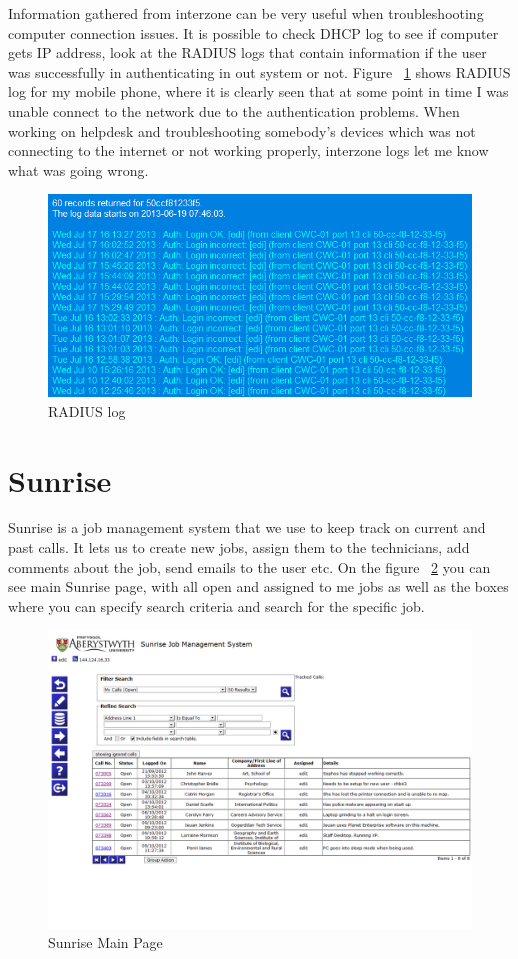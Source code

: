\documentclass[10pt,a4paper,headinclude=true]{report}
\begin{document}
Information gathered from interzone can be very useful when troubleshooting computer connection issues. It is possible to check DHCP log to see if computer gets IP address, look at the RADIUS logs that contain information if the user was successfully in authenticating in out system or not. Figure ~\ref{fig:interzone_radius} shows RADIUS log for my mobile phone, where it is clearly seen that at some point in time I was unable connect to the network due to the authentication problems. When working on helpdesk and troubleshooting somebody's devices which was not connecting to the internet or not working properly, interzone logs let me know what was going wrong.

\begin{figure}[H]
\centering
\centerline{\includegraphics[scale=0.5]{./interzone_radius}}
\caption{RADIUS log}
\label{fig:interzone_radius}
\end{figure}

\section{Sunrise}
Sunrise is a job management system that we use to keep track on current and past calls. It lets us to create new jobs, assign them to the technicians, add comments about the job, send emails to the user etc. On the figure ~\ref{fig:sunrise_main} you can see main Sunrise page, with all open and assigned to me jobs as well as the boxes where you can specify search criteria and search for the specific job.

\begin{figure}[H]
\centering
\centerline{\includegraphics[scale=0.5]{./sunrise_main}}
\caption{Sunrise Main Page}
\label{fig:sunrise_main}
\end{figure}
\end{document}
